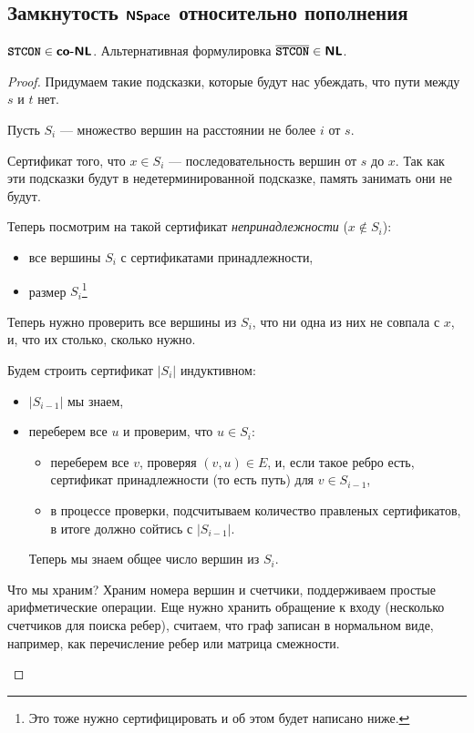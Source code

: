 \subsection{Замкнутость $ \textmd{\textbf{\textsf{NSpace}}}$ относительно пополнения}
\begin{thm}
     $ {\textbf{\texttt{STCON}}} \in \textmd{\textbf{\textsf{co-NL}}}$. Альтернативная формулировка $ \overline{{\textbf{\texttt{STCON}}}} \in \textmd{\textbf{\textsf{NL}}}$. 
\end{thm}
\begin{proof}
	Придумаем такие подсказки, которые будут нас убеждать, что пути между $ s$ и $ t$ нет.

	Пусть $ S_i$ --- множество вершин на расстоянии не более $ i$ от $ s$.

	Сертификат того, что $ x \in S_i$ --- последовательность вершин от $ s $ до $ x$. Так как эти подсказки будут в недетерминированной подсказке, память занимать они не будут.

	Теперь посмотрим на такой сертификат \textit{непринадлежности} ($ x \notin S_i$):
	\begin{itemize}[noitemsep]
		\item все вершины  $ S_i$ с сертификатами принадлежности,
		\item размер $ S_i$\footnote{Это тоже нужно сертифицировать и об этом будет написано ниже.}
	\end{itemize}

	Теперь нужно проверить все вершины из $ S_i$, что ни одна из них не совпала с $ x$, и, что их столько, сколько нужно.

	Будем строить сертификат $ \lvert S_i \rvert $ индуктивном:
	\begin{itemize}[noitemsep]
		\item $ \lvert S_{i-1} \rvert $ мы знаем,
		\item переберем все $ u$ и проверим, что  $ u \in S_i$:
			\begin{itemize}[noitemsep]
				\item переберем все $ v $, проверяя $ (v, u) \in E$, и, если такое ребро есть, сертификат принадлежности (то есть путь) для $ v \in S_{i-1}$,
				\item в процессе проверки, подсчитываем количество правленых сертификатов, в итоге должно сойтись с $ \lvert S_{i-1} \rvert $.
			\end{itemize}
			Теперь мы знаем общее число вершин из $ S_{i}$.
	\end{itemize}
	\begin{note}
		Что мы храним? Храним номера вершин и счетчики, поддерживаем простые арифметические операции. Еще нужно хранить обращение к входу (несколько счетчиков для поиска ребер), считаем, что граф записан в нормальном виде, например, как перечисление ребер или матрица смежности.
	\end{note}
\end{proof}

